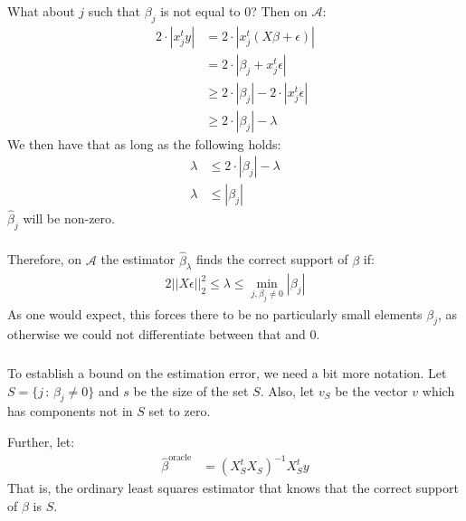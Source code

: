 \begin{frame}[fragile] \frametitle{}

What about $j$ such that $\beta_j$ is not equal to $0$? \pause Then
on $\mathcal{A}$:
\begin{align*}
2 \cdot|x_j^t y| &= 2 \cdot|x_j^t (X \beta + \epsilon) | \\
&= 2 \cdot |\beta_j + x_j^t \epsilon | \\
&\geq 2 \cdot | \beta_j | - 2 \cdot |x_j^t \epsilon | \\
&\geq 2 \cdot | \beta_j | - \lambda
\end{align*}
\pause We then have that as long as the following holds:
\begin{align*}
\lambda &\leq 2 \cdot | \beta_j | - \lambda \\
\lambda &\leq | \beta_j |
\end{align*}
$\widehat{\beta}_j$ will be non-zero.

\end{frame}

\begin{frame}[fragile] \frametitle{}

Therefore, on $\mathcal{A}$ the estimator $\widehat{\beta}_\lambda$
finds the correct support of $\beta$ if:
\begin{align*}
2 || X \epsilon ||_2^2 \leq \lambda \leq \min_{j, \beta_j \neq 0} | \beta_j|
\end{align*}
As one would expect, this forces there to be no particularly small
elements $\beta_j$, as otherwise we could not differentiate between
that and $0$.

\end{frame}


\begin{frame}[fragile] \frametitle{}

To establish a bound on the estimation error, we need a bit
more notation. Let $S = \{j \, : \, \beta_j \neq 0\}$ and $s$
be the size of the set $S$. Also, let $v_{S}$ be the vector
$v$ which has components not in $S$ set to zero.

\pause Further, let:
\begin{align*}
\widehat{\beta}^{\text{oracle}} &= (X^t_S X_S)^{-1} X^t_S y
\end{align*}
That is, the ordinary least squares estimator that knows that
the correct support of $\beta$ is $S$.

\end{frame}

